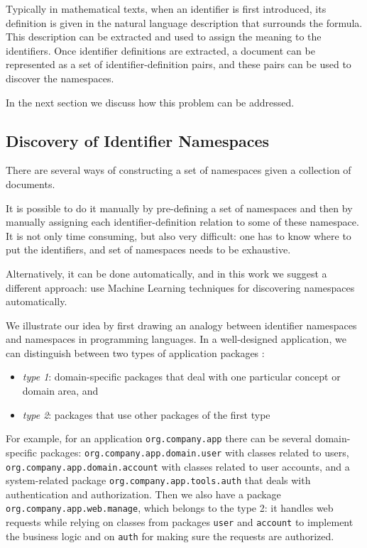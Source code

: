 Typically in mathematical texts, when an identifier is first introduced,
its definition is given in the natural language description that surrounds
the formula. This description can be extracted and used to assign the meaning to
the identifiers. Once identifier definitions are extracted, a document
can be represented as a set of identifier-definition pairs,
and these pairs can be used to discover the namespaces.


In the next section we discuss how this problem can be addressed.


\subsection{Discovery of Identifier Namespaces} \label{sec:discovery-namespaces}

There are several ways of constructing a set of namespaces given a collection 
of documents. 

It is possible to do it manually by pre-defining a set of namespaces and 
then by manually assigning each identifier-definition relation to some of these
namespace. It is not only time consuming, but also very difficult: one has 
to know where to put the identifiers, and set of namespaces needs to be exhaustive. 

Alternatively, it can be done automatically, and in this work we suggest a different 
approach: use Machine Learning techniques for discovering namespaces automatically.

We illustrate our idea by first drawing an analogy between identifier
namespaces and namespaces in programming languages. In a well-designed application, 
we can distinguish between two types of application packages \cite{evans2004domain}:

\begin{itemize}
  \item \emph{type 1}: domain-specific packages that deal with one particular
    concept or domain area, and
  \item \emph{type 2}: packages that use other packages of
    the first type
\end{itemize}



For example, for an application \verb|org.company.app|
there can be several domain-specific packages: \verb|org.company.app.domain.user|
with classes related to users, \verb|org.company.app.domain.account|
with classes related to user accounts, and a system-related package
\verb|org.company.app.tools.auth| that deals with authentication and
authorization. Then we also have a package \verb|org.company.app.web.manage|,
which belongs to the type 2: it handles web requests
while relying on classes from packages \verb|user| and \verb|account| to
implement the business logic and on \verb|auth| for making sure the
requests are authorized.

